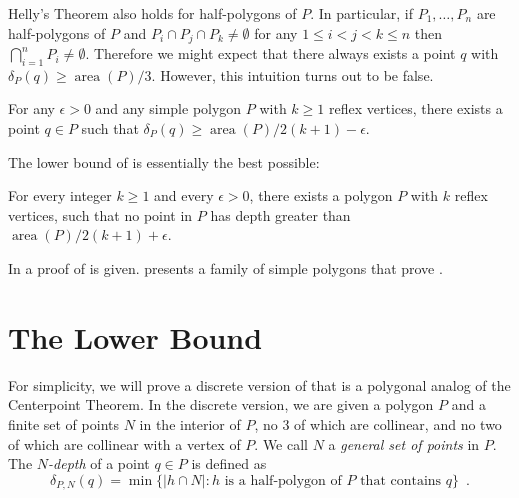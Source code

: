 \documentclass{article}
\DeclareMathOperator{\area}{area}
\begin{document}
Helly's Theorem also holds
for half-polygons of $P$.  In particular, if $P_1,\ldots,P_n$ are
half-polygons of $P$ and $P_i\cap P_j\cap P_k\neq \emptyset$ for any
$1\le i < j < k\le n$ then $\bigcap_{i=1}^n P_i\neq \emptyset$.
Therefore we might expect that there always exists a point $q$ with
$\delta_P(q)\ge \area(P)/3$.  However, this intuition turns out to be
false.

\begin{thm}
For any $\epsilon > 0$ and any simple polygon $P$ with $k \ge 1$
reflex vertices, there exists a point $q\in P$ such that
$\delta_P(q)\ge \area(P)/2(k+1)-\epsilon$.
\end{thm}

The lower bound of  is essentially the best
possible:

\begin{thm}
For every integer $k\ge 1$ and every $\epsilon > 0$,
there exists a polygon $P$ with $k$ reflex vertices, such that no point
in $P$ has depth greater than  $\area(P)/2(k+1) + \epsilon$.
\end{thm}

In  a proof of  is given.
 presents a family of simple polygons that prove
.

\section{The Lower Bound}

For simplicity, we will prove a discrete version of
 that is a polygonal analog of the Centerpoint
Theorem.  In the discrete version, we are given a polygon $P$ and a
finite set of points $N$ in the interior of $P$, no 3 of which are
collinear, and no two of which are collinear with a vertex of $P$.  We
call $N$ a \emph{general set of points} in $P$. The \emph{$N$-depth} 
of a point
$q\in P$ is defined as 
\[
     \delta_{P,N}(q) = \min\{|h\cap N| : \mbox{$h$ is a half-polygon
	of $P$ that contains $q$} \} \enspace .
\]
\end{document}
